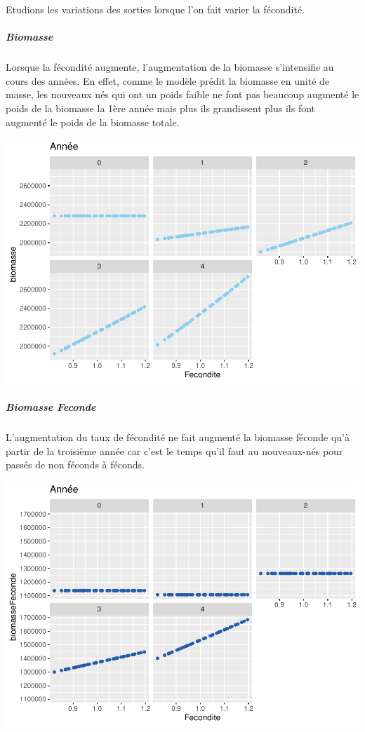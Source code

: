 \documentclass[
]{article}
\begin{document}
Etudions les variations des sorties lorsque l'on fait varier la
fécondité.

\hypertarget{biomasse-5}{%
\subparagraph{Biomasse}\label{biomasse-5}}

Lorsque la fécondité augmente, l'augmentation de la biomasse
s'intensifie au cours des années. En effet, comme le modèle prédit la
biomasse en unité de masse, les nouveaux nés qui ont un poids faible ne
font pas beaucoup augmenté le poids de la biomasse la 1ère année mais
plus ils grandissent plus ils font augmenté le poids de la biomasse
totale.

\includegraphics{rapport_files/figure-latex/aocbv-1.pdf}

\hypertarget{biomasse-feconde-4}{%
\subparagraph{Biomasse Feconde}\label{biomasse-feconde-4}}

L'augmentation du taux de fécondité ne fait augmenté la biomasse féconde
qu'à partir de la troisième année car c'est le temps qu'il faut au
nouveaux-nés pour passés de non féconds à féconds.

\includegraphics{rapport_files/figure-latex/ccxbc-1.pdf}
\end{document}

